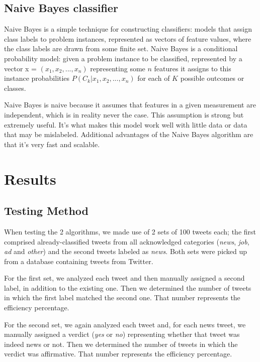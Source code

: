 \documentclass{article}
\begin{document}
\subsection{Naive Bayes classifier}

\large
{
\quad
Naive Bayes is a simple technique for constructing
classifiers: models that assign class labels to problem
instances, represented as vectors of feature values, where the
class labels are drawn from some finite set. Naive Bayes is
a conditional probability model: given a problem instance to
be classified, represented by a vector x =
$(x_1, x_2, ..., x_n)$ representing some $n$ features it assigns to this
instance probabilities
$P(C_k | x_1, x_2, ..., x_n)$ for each of $K$ possible outcomes or
classes.

Naive Bayes is naive because it assumes that features in a given measurement are independent, which is in reality never the case. This assumption is strong but extremely useful. It’s what makes this model work well with little data or data that may be mislabeled. Additional advantages of the Naive Bayes algorithm are that it’s very fast and scalable.\cite{naive_property}
}

\section{Results}

\subsection{Testing Method}
\large{
\quad
When testing the 2 algorithms, we made use of 2 sets of 100 tweets each; the first comprised already-classified tweets from all acknowledged categories (\textit{news}, \textit{job}, \textit{ad} and \textit{other}) and the second tweets labeled as \textit{news}. Both sets were picked up from a database containing tweets from Twitter.

\quad
For the first set, we analyzed each tweet and then manually assigned a second label, in addition to the existing one. Then we determined the number of tweets in which the first label matched the second one. That number represents the efficiency percentage.

\quad
For the second set, we again analyzed each tweet and, for each news tweet, we manually assigned a verdict (\textit{yes} or \textit{no}) representing whether that tweet was indeed news or not. Then we determined the number of tweets in which the verdict was affirmative. That number represents the efficiency percentage.
}
\end{document}
